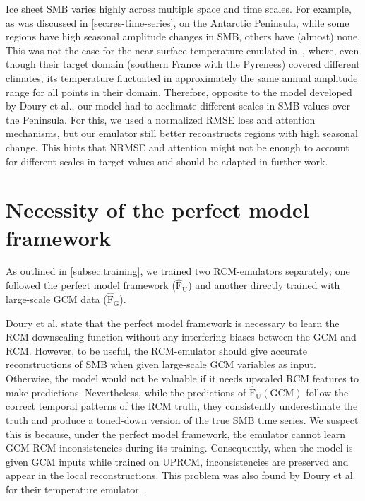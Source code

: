 \documentclass[a4paper,11pt,oneside]{report}
\begin{document}
Ice sheet SMB varies highly across multiple space and time scales. For example, as was discussed in \autoref{sec:res-time-series}, on the Antarctic Peninsula, while some regions have high seasonal amplitude changes in SMB, others have (almost) none. This was not the case for the near-surface temperature emulated in~\cite{Doury}, where, even though their target domain (southern France with the Pyrenees) covered different climates, its temperature fluctuated in approximately the same annual amplitude range for all points in their domain. Therefore, opposite to the model developed by Doury et al., our model had to acclimate different scales in SMB values over the Peninsula. For this, we used a normalized RMSE loss and attention mechanisms, but our emulator still better reconstructs regions with high seasonal change. This hints that NRMSE and attention might not be enough to account for different scales in target values and should be adapted in further work. 


\section{Necessity of the perfect model framework}\label{sec:disc-perfect-model}

As outlined in \autoref{subsec:training}, we trained two RCM-emulators separately; one followed the perfect model framework ($\mathrm{\hat{F}_{U}}$) and another directly trained with large-scale GCM data ($\mathrm{\hat{F}_{G}}$). 


Doury et al. state that the perfect model framework is necessary to learn the RCM downscaling function without any interfering biases between the GCM and RCM. However, to be useful, the RCM-emulator should give accurate reconstructions of SMB when given large-scale GCM variables as input. Otherwise, the model would not be valuable if it needs upscaled RCM features to make predictions. Nevertheless, while the predictions of $\mathrm{\hat{F}_{U}(GCM)}$ follow the correct temporal patterns of the RCM truth, they consistently underestimate the truth and produce a toned-down version of the true SMB time series. We suspect this is because, under the perfect model framework, the emulator cannot learn GCM-RCM inconsistencies during its training. Consequently, when the model is given GCM inputs while trained on UPRCM, inconsistencies are preserved and appear in the local reconstructions. This problem was also found by Doury et al. for their temperature emulator~\cite{Doury}. 
\end{document}
